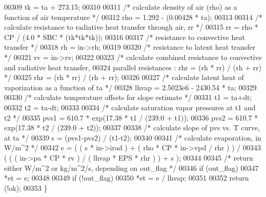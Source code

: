 \begin{DoxyCode}
00309     tk = ta + 273.15;
00310         
00311     \textcolor{comment}{/* calculate density of air (rho) as a function of air temperature */}
00312     rho = 1.292 - (0.00428 * ta);
00313     
00314     \textcolor{comment}{/* calculate resistance to radiative heat transfer through air, rr */}
00315     rr = rho * CP / (4.0 * SBC * (tk*tk*tk));
00316     
00317     \textcolor{comment}{/* resistance to convective heat transfer */}
00318     rh = in->rh;
00319     
00320     \textcolor{comment}{/* resistance to latent heat transfer */}
00321     rv = in->rv;
00322     
00323     \textcolor{comment}{/* calculate combined resistance to convective and radiative heat transfer,}
00324 \textcolor{comment}{    parallel resistances : rhr = (rh * rr) / (rh + rr) */}
00325     rhr = (rh * rr) / (rh + rr);
00326 
00327     \textcolor{comment}{/* calculate latent heat of vaporization as a function of ta */}
00328     lhvap = 2.5023e6 - 2430.54 * ta;
00329 
00330     \textcolor{comment}{/* calculate temperature offsets for slope estimate */}
00331     t1 = ta+dt;
00332     t2 = ta-dt;
00333     
00334     \textcolor{comment}{/* calculate saturation vapor pressures at t1 and t2 */}
00335     pvs1 = 610.7 * exp(17.38 * t1 / (239.0 + t1));
00336     pvs2 = 610.7 * exp(17.38 * t2 / (239.0 + t2));
00337 
00338     \textcolor{comment}{/* calculate slope of pvs vs. T curve, at ta */}
00339     s = (pvs1-pvs2) / (t1-t2);
00340     
00341     \textcolor{comment}{/* calculate evaporation, in W/m^2  */}
00342     e = ( ( s * in->irad ) + ( rho * CP * in->vpd / rhr ) ) /
00343         ( ( ( in->pa * CP * rv ) / ( lhvap * EPS * rhr ) ) + s );
00344     
00345     \textcolor{comment}{/* return either W/m^2 or kg/m^2/s, depending on out\_flag */}    
00346     \textcolor{keywordflow}{if} (out\_flag)
00347         *et = e;
00348     
00349     \textcolor{keywordflow}{if} (!out\_flag)
00350         *et = e / lhvap;
00351     
00352     \textcolor{keywordflow}{return} (!ok);
00353 \}
\end{DoxyCode}
